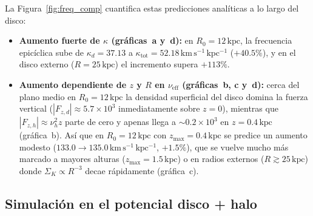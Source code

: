 \documentclass[11pt,letterpaper]{article}
\begin{document}
La Figura~\ref{fig:freq_comp} cuantifica estas predicciones analíticas a lo largo del disco:
\begin{itemize}
    \item \textbf{Aumento fuerte de $\kappa$ (gráficas~a y~d):} en $R_0 = 12\,\mathrm{kpc}$, la frecuencia epicíclica sube de $\kappa_d = 37.13$ a $\kappa_{\mathrm{tot}} = 52.18\,\mathrm{km\,s^{-1}\,kpc^{-1}}$ ($+40.5\%$), y en el disco externo ($R = 25\,\mathrm{kpc}$) el incremento supera $+113\%$.
    \item \textbf{Aumento dependiente de $z$ y $R$ en $\nu_{\mathrm{eff}}$ (gráficas~b, c y~d):} cerca del plano medio en $R_0 = 12\,\mathrm{kpc}$ la densidad superficial del disco domina la fuerza vertical ($|F_{z,d}| \approx 5.7\times 10^3$ inmediatamente sobre $z = 0$), mientras que $|F_{z,h}| \approx \nu_h^2 z$ parte de cero y apenas llega a $\sim 0.2\times 10^3$ en $z = 0.4\,\mathrm{kpc}$ (gráfica~b). Así que en $R_0 = 12\,\mathrm{kpc}$ con $z_{\max} = 0.4\,\mathrm{kpc}$ se predice un aumento modesto ($133.0 \to 135.0\,\mathrm{km\,s^{-1}\,kpc^{-1}}$, $+1.5\%$), que se vuelve mucho más marcado a mayores alturas ($z_{\max} = 1.5\,\mathrm{kpc}$) o en radios externos ($R \gtrsim 25\,\mathrm{kpc}$) donde $\Sigma_K \propto R^{-3}$ decae rápidamente (gráfica~c).
\end{itemize}

\subsection{Simulación en el potencial disco + halo}
\end{document}
